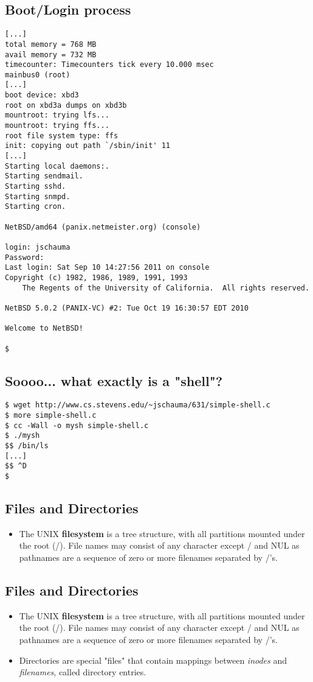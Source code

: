 \documentclass[xga]{xdvislides}
\begin{document}
\subsection{Boot/Login process}
\small
\begin{verbatim}
[...]
total memory = 768 MB
avail memory = 732 MB
timecounter: Timecounters tick every 10.000 msec
mainbus0 (root)
[...]
boot device: xbd3
root on xbd3a dumps on xbd3b
mountroot: trying lfs...
mountroot: trying ffs...
root file system type: ffs
init: copying out path `/sbin/init' 11
[...]
Starting local daemons:.
Starting sendmail.
Starting sshd.
Starting snmpd.
Starting cron.

NetBSD/amd64 (panix.netmeister.org) (console)

login: jschauma
Password:
Last login: Sat Sep 10 14:27:56 2011 on console
Copyright (c) 1982, 1986, 1989, 1991, 1993
    The Regents of the University of California.  All rights reserved.

NetBSD 5.0.2 (PANIX-VC) #2: Tue Oct 19 16:30:57 EDT 2010

Welcome to NetBSD!

$
\end{verbatim}
\Normalsize

\subsection{Soooo... what exactly is a "shell"?}
\vspace*{\fill}
\begin{verbatim}
$ wget http://www.cs.stevens.edu/~jschauma/631/simple-shell.c
$ more simple-shell.c
$ cc -Wall -o mysh simple-shell.c
$ ./mysh
$$ /bin/ls
[...]
$$ ^D
$
\end{verbatim}
\vspace*{\fill}


\subsection{Files and Directories}
\begin{itemize}
	\item The UNIX {\bf filesystem} is a tree structure, with all partitions
		mounted under the root (/). File names may consist of any
		character except / and NUL as pathnames are a sequence of
		zero or more filenames separated by /'s.
\end{itemize}

\subsection{Files and Directories}
\begin{itemize}
	\item The UNIX {\bf filesystem} is a tree structure, with all partitions
		mounted under the root (/). File names may consist of any
		character except / and NUL as pathnames are a sequence of
		zero or more filenames separated by /'s.
	\item Directories are special "files" that contain mappings
		between {\em inodes} and {\em filenames}, called directory
		entries.
\end{itemize}
\end{document}
